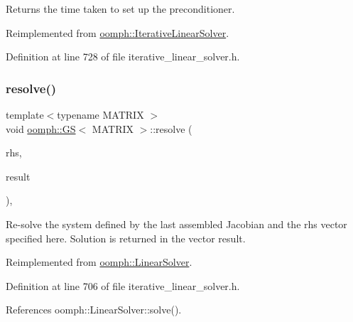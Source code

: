 Returns the time taken to set up the preconditioner. 



Reimplemented from \hyperlink{classoomph_1_1IterativeLinearSolver_a87eb959944a3e8efa467d60aed43a0d3}{oomph\+::\+Iterative\+Linear\+Solver}.



Definition at line 728 of file iterative\+\_\+linear\+\_\+solver.\+h.

\mbox{\label{classoomph_1_1GS_af47ff132824a557b738f3d4ad12d5094}} 
\subsubsection{\texorpdfstring{resolve()}{resolve()}}
{\footnotesize\ttfamily template$<$typename M\+A\+T\+R\+IX $>$ \\
void \hyperlink{classoomph_1_1GS}{oomph\+::\+GS}$<$ M\+A\+T\+R\+IX $>$\+::resolve (\begin{DoxyParamCaption}\item[{const \hyperlink{classoomph_1_1DoubleVector}{Double\+Vector} \&}]{rhs,  }\item[{\hyperlink{classoomph_1_1DoubleVector}{Double\+Vector} \&}]{result }\end{DoxyParamCaption})\hspace{0.3cm}{\ttfamily [inline]}, {\ttfamily [virtual]}}



Re-\/solve the system defined by the last assembled Jacobian and the rhs vector specified here. Solution is returned in the vector result. 



Reimplemented from \hyperlink{classoomph_1_1LinearSolver_a3b310d08333033edc119b2a5bd7dcbfb}{oomph\+::\+Linear\+Solver}.



Definition at line 706 of file iterative\+\_\+linear\+\_\+solver.\+h.



References oomph\+::\+Linear\+Solver\+::solve().

\mbox{\label{classoomph_1_1GS_a92a30b95c5ff0b2eefdc7730c822b6d5}} 

